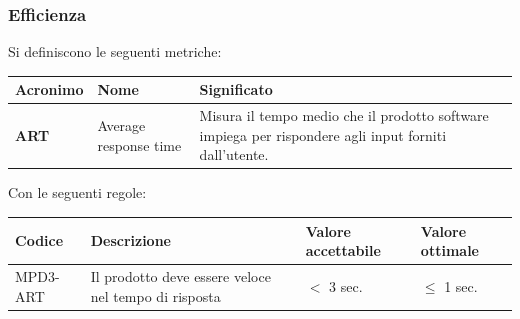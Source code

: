 \subsubsection{Efficienza}
Si definiscono le seguenti metriche:
\begin{table}[h!]
\centering
\def\arraystretch{1.5}
\begin{tabular}{ |m{2cm}|m{5.5cm}|m{6.5cm}| }
\hline
\rowcolor{lightgray!30}
\textbf{Acronimo} & \textbf{Nome} & \textbf{Significato}\\
\hline
\textbf{ART} & Average response time & Misura il tempo medio che il prodotto software impiega per rispondere agli input forniti dall'utente.\\
\hline
\end{tabular}
\end{table}
\par Con le seguenti regole:
\begin{table}[h!]
\centering
\def\arraystretch{1.5}
\begin{tabular}{ |>{\centering\arraybackslash}m{2.5cm}|>{\centering\arraybackslash}m{5.5cm}|>{\centering\arraybackslash}m{3cm}|>{\centering\arraybackslash}m{3cm}| }
\hline
\rowcolor{black}
\textbf{\color{white} Codice} & \textbf{\color{white} Descrizione} & \textbf{\color{white} Valore accettabile} & \textbf{\color{white} Valore ottimale}\\
\hline
MPD3-ART & Il prodotto deve essere veloce nel tempo di risposta & $<$ 3 sec. & $\leq$ 1 sec. \\
\hline
\end{tabular}
\end{table}

